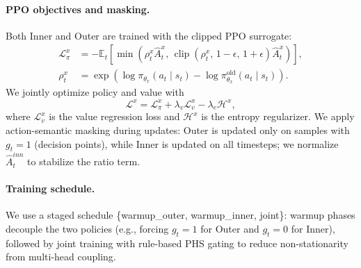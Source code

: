 \documentclass[letterpaper]{article} %
\begin{document}
\paragraph{PPO objectives and masking.}
Both Inner and Outer are trained with the clipped PPO surrogate:
\begin{equation}
\begin{aligned}
\mathcal{L}^{x}_{\pi}
&= -\mathbb{E}_t\!\left[
\min\!\left(
\rho_t^x \hat A_t^x,\,
\operatorname{clip}\!\left(\rho_t^x,\,1-\epsilon,\,1+\epsilon\right)
\hat A_t^x
\right)
\right],\\
\rho_t^x
&= \exp\!\left(
\log \pi_{\theta_x}(a_t \mid s_t)
- \log \pi^{\mathrm{old}}_{\theta_x}(a_t \mid s_t)
\right).
\end{aligned}
\end{equation}
We jointly optimize policy and value with
\begin{equation}
\mathcal{L}^x=\mathcal{L}_\pi^x+\lambda_v\mathcal{L}_v^x-\lambda_e\mathcal{H}^x,
\end{equation}
where $\mathcal{L}_v^x$ is the value regression loss and $\mathcal{H}^x$ is the entropy regularizer.
We apply action-semantic masking during updates: Outer is updated only on samples with $g_t=1$ (decision points),
while Inner is updated on all timesteps; we normalize $\hat A_t^{inn}$ to stabilize the ratio term.

\paragraph{Training schedule.}
We use a staged schedule \{warmup\_outer, warmup\_inner, joint\}: warmup phases decouple the two policies
(e.g., forcing $g_t=1$ for Outer and $g_t=0$ for Inner), followed by joint training with rule-based PHS gating to
reduce non-stationarity from multi-head coupling.
\end{document}
